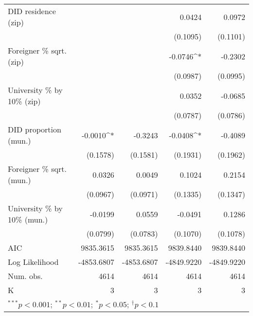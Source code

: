 \begin{tabular}{l D{.}{.}{5.7} D{.}{.}{5.11} D{.}{.}{5.7} D{.}{.}{5.11}}
DID residence (zip)               &               &                  & 0.0424        & 0.0972           \\
                                  &               &                  & (0.1095)      & (0.1101)         \\
Foreigner \% sqrt. (zip)          &               &                  & -0.0746^{*}   & -0.2302          \\
                                  &               &                  & (0.0987)      & (0.0995)         \\
University \% by 10\% (zip)       &               &                  & 0.0352        & -0.0685          \\
                                  &               &                  & (0.0787)      & (0.0786)         \\
DID proportion (mun.)             & -0.0010^{*}   & -0.3243          & -0.0408^{*}   & -0.4089          \\
                                  & (0.1578)      & (0.1581)         & (0.1931)      & (0.1962)         \\
Foreigner \% sqrt. (mun.)         & 0.0326        & 0.0049           & 0.1024        & 0.2154           \\
                                  & (0.0967)      & (0.0971)         & (0.1335)      & (0.1347)         \\
University \% by 10\% (mun.)      & -0.0199       & 0.0559           & -0.0491       & 0.1286           \\
                                  & (0.0799)      & (0.0783)         & (0.1070)      & (0.1078)         \\
\midrule
AIC                               & 9835.3615     & 9835.3615        & 9839.8440     & 9839.8440        \\
Log Likelihood                    & -4853.6807    & -4853.6807       & -4849.9220    & -4849.9220       \\
Num. obs.                         & 4614          & 4614             & 4614          & 4614             \\
K                                 & 3             & 3                & 3             & 3                \\
\bottomrule
{}
\end{tabular}
